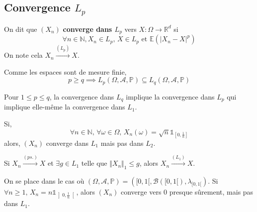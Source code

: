 	\subsection{Convergence \texorpdfstring{$L_p$}{Lp}}


	\begin{definition}
		On dit que $(X_n)$ \textbf{converge dans $L_p$} vers $X : \Omega \rightarrow \mathbb{R}^d$ si
		\[ \forall n \in \mathbb{N}, X_n \in L_p, \, X \in L_p \text{ et } \mathbb{E}(\vert X_n - X \vert^p) \]
		On note cela $X_n \overset{(L_p)}{\longrightarrow} X$.
	\end{definition}


	\begin{proposition}
		Comme les espaces sont de mesure finie,
		\[ p \geq q \implies L_p(\Omega, \mathcal{A}, \mathbb{P}) \subseteq L_q(\Omega, \mathcal{A}, \mathbb{P}) \]
	\end{proposition}

	\begin{corollary}
		Pour $1 \leq p \leq q$, la convergence dans $L_q$ implique la convergence dans $L_p$ qui implique elle-même la convergence dans $L_1$.
	\end{corollary}


	\begin{cexample}
		Si,
		\[
			\forall n \in \mathbb{N}, \, \forall \omega \in \Omega, \, X_n(\omega) = \sqrt{n} \mathbb{1}_{\left[ 0, \frac{1}{n} \right]}
		\]
		alors, $(X_n)$ converge dans $L_1$ mais pas dans $L_2$.
	\end{cexample}


	\begin{theorem}
		Si $X_n \overset{(ps.)}{\longrightarrow} X$ et $\exists g \in L_1$ telle que $\Vert X_n \Vert_1 \leq g$, alors $X_n \overset{(L_1)}{\longrightarrow} X$.
	\end{theorem}


	\begin{cexample}
		On se place dans le cas où $(\Omega, \mathcal{A}, \mathbb{P}) = ([0,1[, \mathcal{B}([0,1[), \lambda_{[0,1[})$. Si $\forall n \geq 1, \, X_n = n \mathbb{1}_{\left] 0, \frac{1}{n} \right[}$, alors $(X_n)$ converge vers $0$ presque sûrement, mais pas dans $L_1$.
	\end{cexample}


